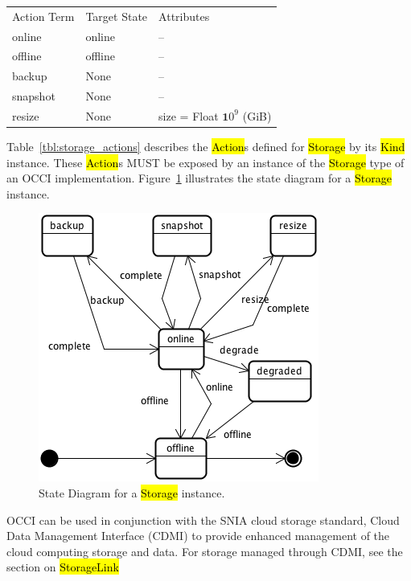 \documentclass[10pt,a4paper]{article}
\begin{document}
{
	\begin{tabular}{lll}
	\toprule
	Action Term&Target State&Attributes\\
	\colrule
	online & online & --\\
	offline & offline & --\\
	backup & None & --\\
	snapshot & None & --\\
	resize & None & size = Float  ${\mathbf 10}^9$ (GiB)
	\end{tabular}
}

Table~\ref{tbl:storage_actions} describes the \hl{Action}s defined for
\hl{Storage} by its \hl{Kind} instance. These \hl{Action}s MUST be exposed 
by an instance of the \hl{Storage} type of an OCCI implementation. 
Figure~\ref{fig:storage_state} illustrates the state diagram for a \hl{Storage} instance.

\begin{figure}[!h]
	\centering
	\includegraphics[scale=0.4]{figs/storage-state.png}
	\caption{State Diagram for a \hl{Storage} instance.}
	\label{fig:storage_state}
\end{figure}

OCCI can be used in conjunction with the SNIA cloud storage standard, Cloud Data 
Management Interface (CDMI)
\cite{cdmi} to provide enhanced management of the cloud computing storage and data. For 
storage managed through CDMI, see the section on \hl{StorageLink}
\end{document}
